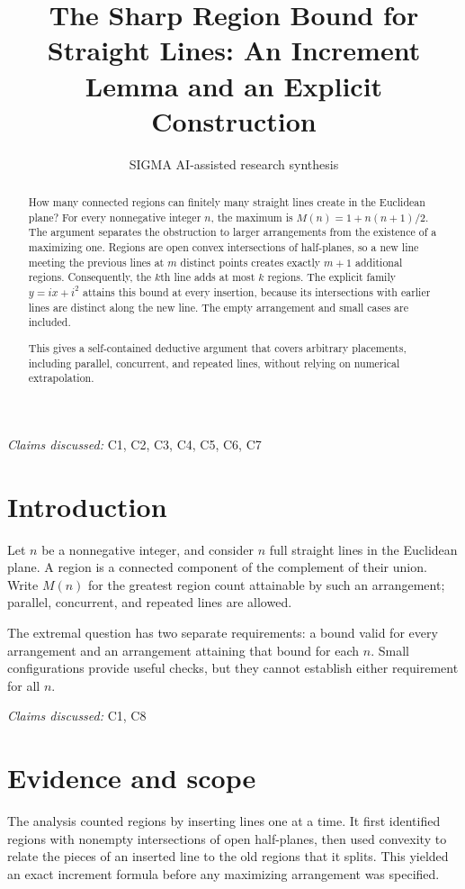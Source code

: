 \documentclass[11pt]{article}
\title{The Sharp Region Bound for Straight Lines: An Increment Lemma and an Explicit Construction}
\date{}
\author{SIGMA AI-assisted research synthesis}
\begin{document}
\maketitle

\begin{abstract}
How many connected regions can finitely many straight lines create in the Euclidean plane? For every nonnegative integer $n$, the maximum is $M(n)=1+n(n+1)/2$. The argument separates the obstruction to larger arrangements from the existence of a maximizing one. Regions are open convex intersections of half-planes, so a new line meeting the previous lines at $m$ distinct points creates exactly $m+1$ additional regions. Consequently, the $k$th line adds at most $k$ regions. The explicit family $y=ix+i^2$ attains this bound at every insertion, because its intersections with earlier lines are distinct along the new line. The empty arrangement and small cases are included.

This gives a self-contained deductive argument that covers arbitrary placements, including parallel, concurrent, and repeated lines, without relying on numerical extrapolation.
\end{abstract}
\textit{Claims discussed: }C1, C2, C3, C4, C5, C6, C7
\section{Introduction}
Let $n$ be a nonnegative integer, and consider $n$ full straight lines in the Euclidean plane. A region is a connected component of the complement of their union. Write $M(n)$ for the greatest region count attainable by such an arrangement; parallel, concurrent, and repeated lines are allowed.

The extremal question has two separate requirements: a bound valid for every arrangement and an arrangement attaining that bound for each $n$. Small configurations provide useful checks, but they cannot establish either requirement for all $n$.

\textit{Claims discussed: }C1, C8
\section{Evidence and scope}
The analysis counted regions by inserting lines one at a time. It first identified regions with nonempty intersections of open half-planes, then used convexity to relate the pieces of an inserted line to the old regions that it splits. This yielded an exact increment formula before any maximizing arrangement was specified.
\end{document}
